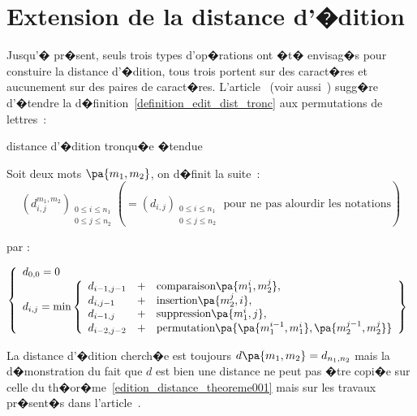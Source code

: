 \section{Extension de la distance d'�dition}

Jusqu'� pr�sent, seuls trois types d'op�rations ont �t� envisag�s pour constuire la distance d'�dition, tous trois portent sur des caract�res et aucunement sur des paires de caract�res. L'article~ (voir aussi~) sugg�re d'�tendre la d�finition~\ref{definition_edit_dist_tronc} aux permutations de lettres~:




		\begin{xdefinition}{distance d'�dition tronqu�e �tendue} \label{definition_edit_dist_tronc_2}
		
		Soit deux mots $\pa{m_1,m_2}$, on d�finit la suite~:
		    $$
		    \left( d_{i,j}^{m_{1},m_{2}}\right) _{\substack{0\leqslant
		    i\leqslant n_{1}\\0\leqslant j\leqslant n_{2}}}\left( =\left(d_{i,j}\right) _{\substack{0\leqslant i\leqslant
		    n_{1}\\0\leqslant
		    j\leqslant n_{2}}}\text{ pour ne pas alourdir les notations}\right)
		    $$
		
		    par :
		
		    $$
		    \left\{
		    \begin{array}[c]{l}%
		    d_{0,0}=0\\
		    d_{i,j}=\min\left\{
		    \begin{array}{lll}
		    d_{i-1,j-1} & + &   \text{comparaison}  \pa{m_1^i,m_2^j},      \\
		    d_{i,j-1}   & + &   \text{insertion}    \pa{m_2^j,i},          \\
		    d_{i-1,j}   & + &   \text{suppression}  \pa{m_1^i,j},          \\
		    d_{i-2,j-2} & + &   \text{permutation}  \pa{ \pa{m_1^{i-1}, m_1^i},\pa{m_2^{j-1}, m_2^j}}
		    \end{array}
		    \right\}%
		    \end{array}
		    \right.
		    $$
		\end{xdefinition}

La distance d'�dition cherch�e est toujours $d\pa{m_1,m_2} = d_{n_1,n_2}$ mais la d�monstration du
fait que $d$ est bien une distance ne peut pas �tre copi�e sur celle du th�or�me~\ref{edition_distance_theoreme001} mais sur les travaux pr�sent�s dans l'article~.








